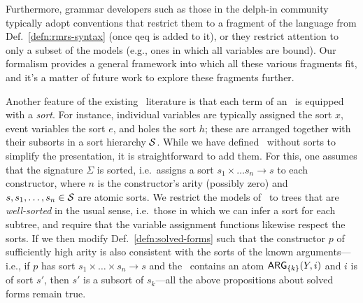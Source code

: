 Furthermore, grammar developers such as those in the {\sc delph-in}
community typically adopt conventions that restrict them to a fragment
of the language from Def.~\ref{defn:rmrs-syntax} (once qeq is added to
it), or they restrict attention to only a subset of the models (e.g.,
ones in which all variables are bound). Our formalism provides a
general framework into which all these various fragments fit, and it's
a matter of future work to explore these fragments further.

Another feature of the existing \rmrs\ literature is that each term of
an \rmrs\ is equipped with a \emph{sort}.  For instance, individual
variables are typically assigned the sort $x$, event variables the
sort $e$, and holes the sort $h$; these are arranged together with
their subsorts in a sort hierarchy ${\cal S}$.  While we have defined
\rmrs\ without sorts to simplify the presentation, it is
straightforward to add them.  For this, one assumes that the signature
$\Sigma$ is sorted, i.e.\ assigns a sort $s_1\times\ldots
s_n\rightarrow s$ to each constructor, where $n$ is the constructor's
arity (possibly zero) and $s,s_1,\ldots,s_n\in {\cal S}$ are atomic
sorts.  We restrict the models of \rmrs\ to trees that are
\emph{well-sorted} in the usual sense, i.e.\ those in which we can
infer a sort for each subtree, and require that the variable
assignment functions likewise respect the sorts.  If we then modify
Def.~\ref{defn:solved-forms} such that the constructor $p$ of
sufficiently high arity is also consistent with the sorts of the known
arguments---i.e., if $p$ has sort $s_1 \times \ldots \times s_n
\rightarrow s$ and the \rmrs\ contains an atom $\mathsf{ARG}_{\{k\}}(Y,i)$ and
$i$ is of sort $s'$, then $s'$ is a subsort of $s_k$---all the above
propositions about solved forms remain true.



